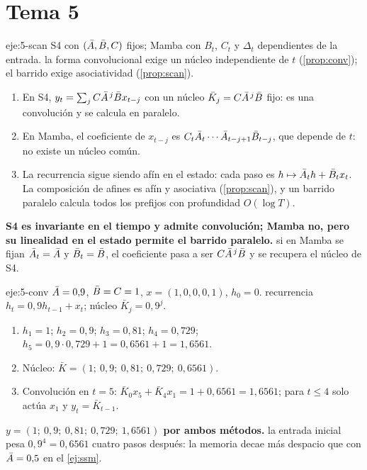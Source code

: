 \section{Tema 5}

\begin{solucion}{eje:5-scan}
\datos S4 con $(\bar{A},\bar{B},C)$ fijos; Mamba con $B_t$, $C_t$ y $\Delta_t$ dependientes de la entrada.
\planteamiento la forma convolucional exige un núcleo independiente de $t$ (\cref{prop:conv}); el barrido exige asociatividad (\cref{prop:scan}).
\pasos
\begin{enumerate}[label=\arabic*.]
  \item En S4, $y_t=\sum_jC\bar{A}^{\,j}\bar{B} x_{t-j}$ con un núcleo $\bar K_j=C\bar{A}^{\,j}\bar{B}$ fijo: es una convolución y se calcula en paralelo.
  \item En Mamba, el coeficiente de $x_{t-j}$ es $C_t\bar{A}_t\cdots\bar{A}_{t-j+1}\bar{B}_{t-j}$, que depende de $t$: no existe un núcleo común.
  \item La recurrencia sigue siendo afín en el estado: cada paso es $h\mapsto\bar{A}_th+\bar{B}_tx_t$. La composición de afines es afín y asociativa (\cref{prop:scan}), y un barrido paralelo calcula todos los prefijos con profundidad $O(\log T)$.
\end{enumerate}
\resultado \textbf{S4 es invariante en el tiempo y admite convolución; Mamba no, pero su linealidad en el estado permite el barrido paralelo.}
\comprobacion si en Mamba se fijan $\bar{A}_t=\bar{A}$ y $\bar{B}_t=\bar{B}$, el coeficiente pasa a ser $C\bar{A}^{\,j}\bar{B}$ y se recupera el núcleo de S4.
\end{solucion}

\begin{solucion}{eje:5-conv}
\datos $\bar{A}=0{,}9$, $\bar{B}=C=1$, $x=(1,0,0,0,1)$, $h_0=0$.
\planteamiento recurrencia $h_t=0{,}9h_{t-1}+x_t$; núcleo $\bar K_j=0{,}9^{j}$.
\pasos
\begin{enumerate}[label=\arabic*.]
  \item $h_1=1$; $h_2=0{,}9$; $h_3=0{,}81$; $h_4=0{,}729$; $h_5=0{,}9\cdot 0{,}729+1=0{,}6561+1=1{,}6561$.
  \item Núcleo: $\bar K=(1;\ 0{,}9;\ 0{,}81;\ 0{,}729;\ 0{,}6561)$.
  \item Convolución en $t=5$: $\bar K_0x_5+\bar K_4x_1=1+0{,}6561=1{,}6561$; para $t\le 4$ solo actúa $x_1$ y $y_t=\bar K_{t-1}$.
\end{enumerate}
\resultado \textbf{$y=(1;\ 0{,}9;\ 0{,}81;\ 0{,}729;\ 1{,}6561)$ por ambos métodos.}
\comprobacion la entrada inicial pesa $0{,}9^{4}=0{,}6561$ cuatro pasos después: la memoria decae más despacio que con $\bar{A}=0{,}5$ en el \cref{ej:ssm}.
\end{solucion}


